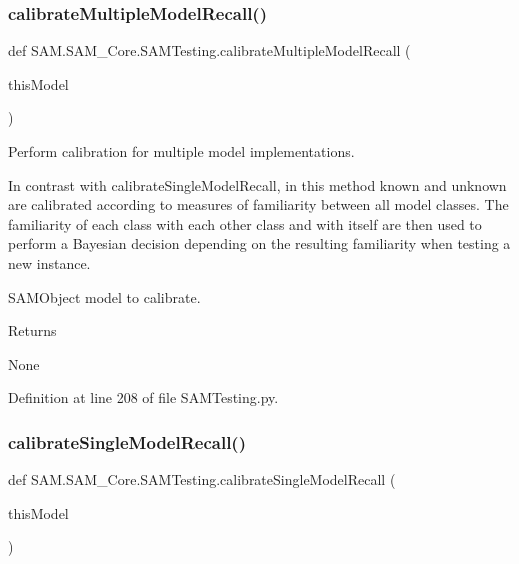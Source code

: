 \mbox{\label{group__icubclient__SAM__Tests_ga609a55c3b5bbf9ab1f9759c240aefd8e}} 
\subsubsection{\texorpdfstring{calibrate\+Multiple\+Model\+Recall()}{calibrateMultipleModelRecall()}}
{\footnotesize\ttfamily def S\+A\+M.\+S\+A\+M\+\_\+\+Core.\+S\+A\+M\+Testing.\+calibrate\+Multiple\+Model\+Recall (\begin{DoxyParamCaption}\item[{}]{this\+Model }\end{DoxyParamCaption})}



Perform calibration for multiple model implementations. 

In contrast with calibrate\+Single\+Model\+Recall, in this method known and unknown are calibrated according to measures of familiarity between all model classes. The familiarity of each class with each other class and with itself are then used to perform a Bayesian decision depending on the resulting familiarity when testing a new instance.

\begin{DoxyVerb}        SAMObject model to calibrate.
\end{DoxyVerb}


\begin{DoxyReturn}{Returns}


None 
\end{DoxyReturn}


Definition at line 208 of file S\+A\+M\+Testing.\+py.

\mbox{\label{group__icubclient__SAM__Tests_ga9c6b9bfe733e2ff320995ec7e0ee9cdf}} 
\subsubsection{\texorpdfstring{calibrate\+Single\+Model\+Recall()}{calibrateSingleModelRecall()}}
{\footnotesize\ttfamily def S\+A\+M.\+S\+A\+M\+\_\+\+Core.\+S\+A\+M\+Testing.\+calibrate\+Single\+Model\+Recall (\begin{DoxyParamCaption}\item[{}]{this\+Model }\end{DoxyParamCaption})}



